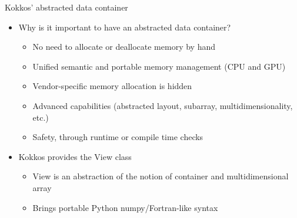 \documentclass[
    aspectratio=169,
    handout,
]{beamer}
\begin{document}
\begin{frame}[fragile]{Kokkos' abstracted data container}
    \begin{itemize}
        \item Why is it important to have an abstracted data container?
        \begin{itemize}
            \item<1-> No need to allocate or deallocate memory by hand
            \item<2-> Unified semantic and portable memory management (CPU and GPU)
            \item<3-> Vendor-specific memory allocation is hidden
            \item<4-> Advanced capabilities (abstracted layout, subarray, multidimensionality, etc.)
            \item<5-> Safety, through runtime or compile time checks
        \end{itemize}
        \item<6-> Kokkos provides the View class
        \begin{itemize}
            \item<7-> View is an abstraction of the notion of container and multidimensional array
            \item<8-> Brings portable Python numpy/Fortran-like syntax
        \end{itemize}
    \end{itemize}
\end{frame}

\end{document}
